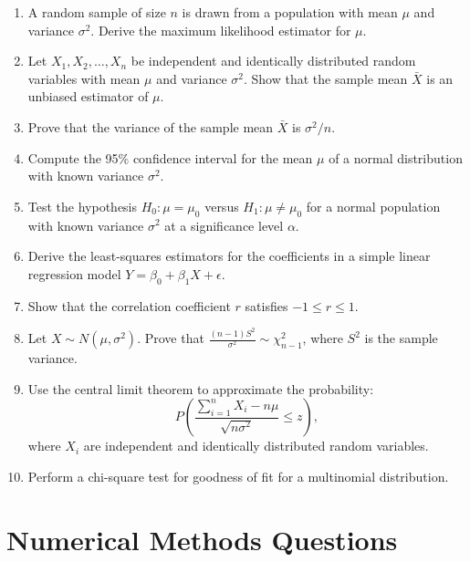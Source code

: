 \documentclass{article}
\begin{document}
\begin{enumerate}
    \item A random sample of size \( n \) is drawn from a population with mean \( \mu \) and variance \( \sigma^2 \). Derive the maximum likelihood estimator for \( \mu \).

    \item Let \( X_1, X_2, \dots, X_n \) be independent and identically distributed random variables with mean \( \mu \) and variance \( \sigma^2 \). Show that the sample mean \( \bar{X} \) is an unbiased estimator of \( \mu \).

    \item Prove that the variance of the sample mean \( \bar{X} \) is \( \sigma^2 / n \).

    \item Compute the 95\% confidence interval for the mean \( \mu \) of a normal distribution with known variance \( \sigma^2 \).

    \item Test the hypothesis \( H_0: \mu = \mu_0 \) versus \( H_1: \mu \neq \mu_0 \) for a normal population with known variance \( \sigma^2 \) at a significance level \( \alpha \).

    \item Derive the least-squares estimators for the coefficients in a simple linear regression model \( Y = \beta_0 + \beta_1 X + \epsilon \).

    \item Show that the correlation coefficient \( r \) satisfies \( -1 \leq r \leq 1 \).

    \item Let \( X \sim N(\mu, \sigma^2) \). Prove that \( \frac{(n-1)S^2}{\sigma^2} \sim \chi^2_{n-1} \), where \( S^2 \) is the sample variance.

    \item Use the central limit theorem to approximate the probability:
    \[
    P\left( \frac{\sum_{i=1}^n X_i - n\mu}{\sqrt{n\sigma^2}} \leq z \right),
    \]
    where \( X_i \) are independent and identically distributed random variables.

    \item Perform a chi-square test for goodness of fit for a multinomial distribution.
\end{enumerate}

\section*{Numerical Methods Questions}
\end{document}
